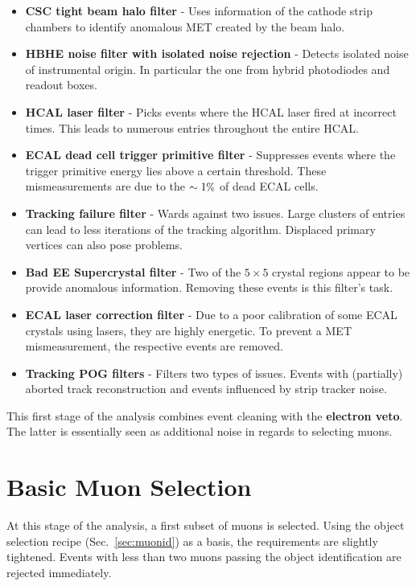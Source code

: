 \begin{itemize}
\item \textbf{CSC tight beam halo filter} - Uses information of the cathode strip chambers to identify anomalous MET created by the beam halo.
\item \textbf{HBHE noise filter with isolated noise rejection} - Detects isolated noise of instrumental origin. In particular the one from hybrid photodiodes and readout boxes.
\item \textbf{HCAL laser filter} - Picks events where the HCAL laser fired at incorrect times. This leads to numerous entries throughout the entire HCAL.
\item \textbf{ECAL dead cell trigger primitive filter} - Suppresses events where the trigger primitive energy lies above a certain threshold. These mismeasurements are due to the $\sim 1\pct$ of dead ECAL cells.
\item \textbf{Tracking failure filter} - Wards against two issues. Large clusters of entries can lead to less iterations of the tracking algorithm. Displaced primary vertices can also pose problems.
\item \textbf{Bad EE Supercrystal filter} - Two of the $5 \times 5$ crystal regions appear to be provide anomalous information. Removing these events is this filter's task.
\item \textbf{ECAL laser correction filter} - Due to a poor calibration of some ECAL crystals using lasers, they are highly energetic. To prevent a MET mismeasurement, the respective events are removed. 
\item \textbf{Tracking POG filters} - Filters two types of issues. Events with (partially) aborted track reconstruction and events influenced by strip tracker noise.
\end{itemize}

This first stage of the analysis combines event cleaning with the \textbf{electron veto}. The latter is essentially seen as additional noise in regards to selecting muons.

\section{Basic Muon Selection}
\label{sec:basicmuon}

At this stage of the analysis, a first subset of muons is selected. Using the object selection recipe (Sec.~\ref{sec:muonid}) as a basis, the requirements are slightly tightened. Events with less than two muons passing the object identification are rejected immediately.

